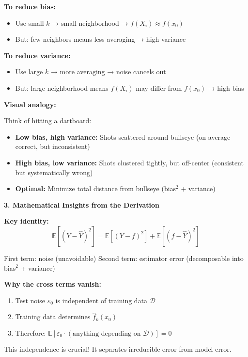 \documentclass[12pt]{article}
\begin{document}
\begin{explanation}
\textbf{To reduce bias:}
\begin{itemize}
    \item Use small \(k\) → small neighborhood → \(f(X_i) \approx f(x_0)\)
    \item But: few neighbors means less averaging → high variance
\end{itemize}

\textbf{To reduce variance:}
\begin{itemize}
    \item Use large \(k\) → more averaging → noise cancels out
    \item But: large neighborhood means \(f(X_i)\) may differ from \(f(x_0)\) → high bias
\end{itemize}

\textbf{Visual analogy:}

Think of hitting a dartboard:
\begin{itemize}
    \item \textbf{Low bias, high variance:} Shots scattered around bullseye (on average correct, but inconsistent)
    \item \textbf{High bias, low variance:} Shots clustered tightly, but off-center (consistent but systematically wrong)
    \item \textbf{Optimal:} Minimize total distance from bullseye (bias\(^2\) + variance)
\end{itemize}

\textbf{3. Mathematical Insights from the Derivation}

\textbf{Key identity:}
\[
\mathbb{E}[(Y - \hat{Y})^2] = \mathbb{E}[(Y - f)^2] + \mathbb{E}[(f - \hat{Y})^2]
\]

First term: noise (unavoidable)
Second term: estimator error (decomposable into bias\(^2\) + variance)

\textbf{Why the cross terms vanish:}

\begin{enumerate}
    \item Test noise \(\varepsilon_0\) is independent of training data \(\mathcal{D}\)
    \item Training data determines \(\hat{f}_k(x_0)\)
    \item Therefore: \(\mathbb{E}[\varepsilon_0 \cdot (\text{anything depending on } \mathcal{D})] = 0\)
\end{enumerate}

This independence is crucial! It separates irreducible error from model error.


\end{explanation}
\end{document}
